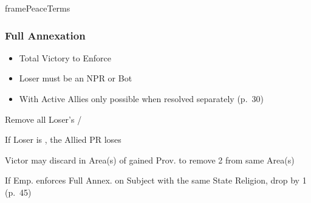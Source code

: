 \documentclass[10pt]{article}
\newlength{\fhPeaceTerms} \setlength\fhPeaceTerms{45.5\baselineskip}
\begin{document}
\begin{dynamiccontents*}{framePeaceTerms}
\begin{eubox}{\fhPeaceTerms}
\begin{multicols}{3}
		\subsubsection*{Full Annexation}
		\begin{itemize}
			{
				\color{peaceReqColor}
				\item {}
				\begin{itemize}
					\item Total Victory to Enforce
					\item Loser must be an NPR or Bot
					\item With Active Allies only possible when resolved separately (p.~30)
				\end{itemize}
			}
			\item Remove all Loser's \alliances/\marriages
			\item If Loser is \activeally, the Allied PR loses 
			\item Victor may discard \claims in Area(s) of gained Prov. to remove 2 \unrest from same Area(s)
			\item If Emp. enforces Full Annex. on Subject with the same State Religion, drop \authority by 1 (p.~45)
		\end{itemize}


\end{multicols}
\end{eubox}
\end{dynamiccontents*}
\end{document}
